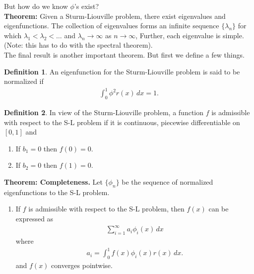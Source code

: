 \documentclass{book}
\theoremstyle{definition}
\newtheorem{defn}{Definition}[section]
\begin{document}
But how do we know $\phi$'s exist?\\

\textbf{Theorem:} Given a Sturm-Liouville problem, there exist eigenvalues and eigenfunctions. The collection of eigenvalues forms an infinite sequence $\{\lambda_n\}$ for which $\lambda_1<\lambda_2 <\dots$ and $\lambda_n\to \infty$ as $n\to\infty$, Further, each eigenvalue is simple. (Note: this has to do with the spectral theorem).\\

The final result is another important theorem. But first we define a few things. 
\begin{defn}
	An eigenfunction for the Sturm-Liouville problem is said to be normalized if 
	\begin{align*}
	\int^1_0 \phi^2 r(x)\,dx = 1.
	\end{align*}
\end{defn}

\begin{defn}
	In view of the Sturm-Liouville problem, a function $f$ is admissible with respect to the S-L problem if it is continuous, piecewise differentiable on $[0,1]$ and 
	\begin{enumerate}
		\item If $b_1 = 0$ then $f(0) = 0$.
		\item If $b_2 = 0$ then $f(1) = 0$.
	\end{enumerate}
\end{defn}

\textbf{Theorem: Completeness.} Let $\{ \phi_n\}$ be the sequence of normalized eigenfunctions to the S-L problem. 
\begin{enumerate}
	\item If $f$ is admissible with respect to the S-L problem, then $f(x)$ can be expressed as
	\begin{align*}
	\sum_{i=1}^\infty a_i \phi_i(x)\,dx
	\end{align*}
	where
	\begin{align*}
	a_i = \int^1_0 f(x)\phi_i(x)r(x)\,dx.
	\end{align*}
	and $f(x)$ converges pointwise. 
\end{enumerate}
\end{document}
